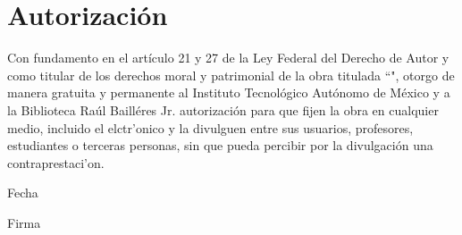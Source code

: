 \chapter*{Autorización}

Con fundamento en el artículo 21 y 27 de la Ley Federal del Derecho de Autor y como titular de los derechos moral y patrimonial de la obra titulada ``\inserttitle", otorgo de manera gratuita y permanente al Instituto Tecnológico Autónomo de México y a la Biblioteca Raúl Bailléres Jr. autorización para que fijen la obra en cualquier medio, incluido el elctr'onico y la divulguen entre sus usuarios, profesores, estudiantes o terceras personas, sin que pueda percibir por la divulgación una contraprestaci'on.

\vspace{15 mm}
\begin{center}
  \insertauthor
\end{center}

\vspace{10 mm}
\begin{center}
\hspace{0.5cm} \makebox[3.5 in]{\hrulefill}
\end{center}
\begin{center}
  Fecha
\end{center}

\vspace{10 mm}
\begin{center}
\hspace{0.5cm} \makebox[3.5 in]{\hrulefill}
\end{center}

\begin{center}
  Firma
\end{center}